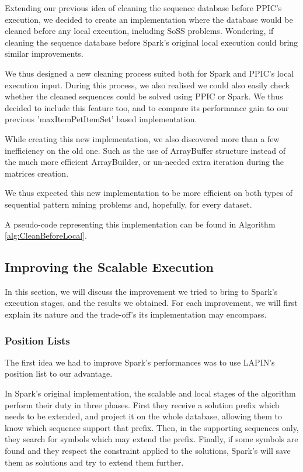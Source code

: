 \documentclass{eplmastersthesis}
\begin{document}
Extending our previous idea of cleaning the sequence database before PPIC's execution, we decided to create an implementation where the database would be cleaned before any local execution, including \acrshort{SoSS} problems. Wondering, if cleaning the sequence database before Spark's original local execution could bring similar improvements. \newline

We thus designed a new cleaning process suited both for Spark and PPIC's local execution input. During this process, we also realised we could also easily check whether the cleaned sequences could be solved using PPIC or Spark. We thus decided to include this feature too, and to compare its performance gain to our previous 'maxItemPetItemSet' based implementation. \newline

While creating this new implementation, we also discovered more than a few inefficiency on the old one. Such as the use of ArrayBuffer structure instead of the much more efficient ArrayBuilder, or un-needed extra iteration during the matrices creation. \newline

We thus expected this new implementation to be more efficient on both types of sequential pattern mining problems and, hopefully, for every dataset. \newline

A pseudo-code representing this implementation can be found in Algorithm \ref{alg:CleanBeforeLocal}.

\subsection{Improving the Scalable Execution}

In this section, we will discuss the improvement we tried to bring to Spark's execution stages, and the results we obtained. For each improvement, we will first explain its nature and the trade-off's its implementation may encompass.

\subsubsection{Position Lists}

The first idea we had to improve Spark's performances was to use LAPIN's position list to our advantage. \newline

In Spark's original implementation, the scalable and local stages of the algorithm perform their duty in three phases. First they receive a solution prefix which needs to be extended, and project it on the whole database, allowing them to know which sequence support that prefix. Then, in the supporting sequences only, they search for symbols which may extend the prefix. Finally, if some symbols are found and they respect the constraint applied to the solutions, Spark's will save them as solutions and try to extend them further. \newline
\end{document}
